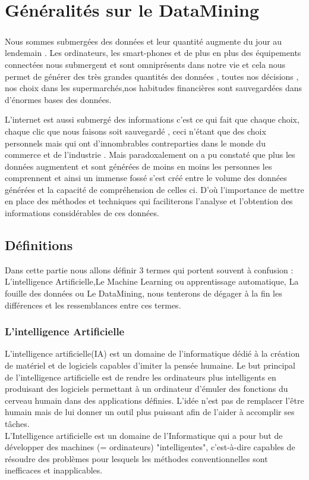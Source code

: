 \chapter{Généralités sur le DataMining }
\paragraph{}
Nous sommes submergées des données et leur quantité augmente du jour au lendemain . Les ordinateurs, les smart-phones et de plus en plus des équipements connectées nous submergent et sont omniprésents dans notre vie et cela nous permet de générer des très grandes quantités des données , toutes nos décisions , nos choix dans les supermarchés,nos habitudes financières sont sauvegardées dans d'énormes bases des données.

L'internet est aussi submergé des informations c'est ce qui fait que chaque choix, chaque clic que nous faisons soit sauvegardé , ceci n'étant  que des choix personnels mais qui ont d'innombrables contreparties dans le monde du commerce et de l'industrie .
Mais paradoxalement on a pu constaté  que plus les données augmentent et sont générées de moins en moins les personnes les comprennent   et ainsi un immense fossé s'est créé entre le volume des données générées et la capacité de compréhension de celles ci.
D'où l'importance de mettre en place des méthodes et techniques qui faciliterons l'analyse et l'obtention des informations considérables de ces données.
\section{Définitions}
Dans cette partie nous allons définir 3 termes qui portent souvent à confusion : L'intelligence Artificielle,Le Machine Learning ou apprentissage automatique, La fouille des données ou Le DataMining, nous tenterons de dégager à la fin les différences et les ressemblances entre ces  termes.
\subsection{L'intelligence Artificielle}
L’intelligence artificielle(IA) est un domaine de l’informatique dédié à la création de matériel et de logiciels capables d’imiter la pensée humaine. Le but principal de l’intelligence artificielle est de rendre les ordinateurs plus intelligents en produisant des logiciels permettant à un ordinateur d’émuler des fonctions du cerveau humain dans des applications définies. L’idée n’est pas de remplacer l’être humain mais de lui donner un outil plus puissant afin de l’aider à accomplir ses tâches.\cite{coursKasoro}\\
L'Intelligence artificielle est un domaine de l'Informatique qui a pour but de développer des machines 
(= ordinateurs) "intelligentes", c'est-à-dire capables de résoudre des problèmes pour lesquels les méthodes conventionnelles sont inefficaces et inapplicables. 
\cite{coursKasoro}
